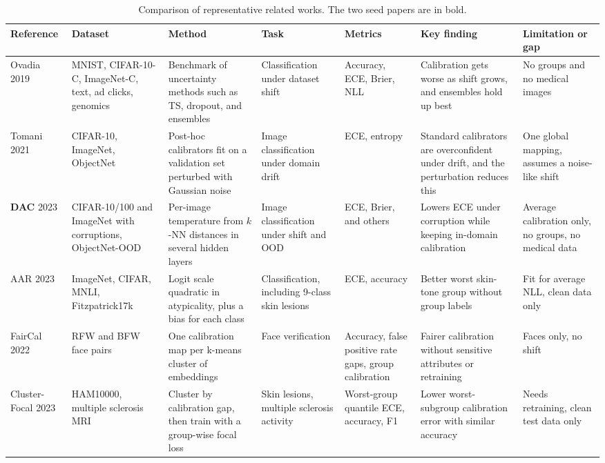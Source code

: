 \documentclass[sigconf,nonacm]{acmart}
\begin{document}
\begin{table}[t]
  \caption{Comparison of representative related works. The two seed papers are in bold.}
  \label{tab:literature}
  \scriptsize
  \setlength{\tabcolsep}{3pt}
  \renewcommand{\arraystretch}{1.1}
  \begin{tabularx}{\textwidth}{@{}P{1.75cm}P{2.3cm}LP{1.9cm}P{1.85cm}LP{2.55cm}@{}}
    \toprule
    \textbf{Reference} & \textbf{Dataset} & \textbf{Method} & \textbf{Task} & \textbf{Metrics} & \textbf{Key finding} & \textbf{Limitation or gap} \\
    \midrule
    Ovadia 2019 \cite{ovadia2019trust} & MNIST, CIFAR-10-C, ImageNet-C, text, ad clicks, genomics & Benchmark of uncertainty methods such as TS, dropout, and ensembles & Classification under dataset shift & Accuracy, ECE, Brier, NLL & Calibration gets worse as shift grows, and ensembles hold up best & No groups and no medical images \\
    \addlinespace
    Tomani 2021 \cite{tomani2021posthoc} & CIFAR-10, ImageNet, ObjectNet & Post-hoc calibrators fit on a validation set perturbed with Gaussian noise & Image classification under domain drift & ECE, entropy & Standard calibrators are overconfident under drift, and the perturbation reduces this & One global mapping, assumes a noise-like shift \\
    \addlinespace
    \textbf{DAC} 2023 \cite{tomani2023dac} & CIFAR-10/100 and ImageNet with corruptions, ObjectNet-OOD & Per-image temperature from $k$-NN distances in several hidden layers & Image classification under shift and OOD & ECE, Brier, and others & Lowers ECE under corruption while keeping in-domain calibration & Average calibration only, no groups, no medical data \\
    \addlinespace
    AAR 2023 \cite{yuksekgonul2023atypicality} & ImageNet, CIFAR, MNLI, Fitzpatrick17k & Logit scale quadratic in atypicality, plus a bias for each class & Classification, including 9-class skin lesions & ECE, accuracy & Better worst skin-tone group without group labels & Fit for average NLL, clean data only \\
    \addlinespace
    FairCal 2022 \cite{salvador2022faircal} & RFW and BFW face pairs & One calibration map per k-means cluster of embeddings & Face verification & Accuracy, false positive rate gaps, group calibration & Fairer calibration without sensitive attributes or retraining & Faces only, no shift \\
    \addlinespace
    Cluster-Focal 2023 \cite{shui2023clusterfocal} & HAM10000, multiple sclerosis MRI & Cluster by calibration gap, then train with a group-wise focal loss & Skin lesions, multiple sclerosis activity & Worst-group quantile ECE, accuracy, F1 & Lower worst-subgroup calibration error with similar accuracy & Needs retraining, clean test data only \\

\end{tabularx}
\end{table}
\end{document}
